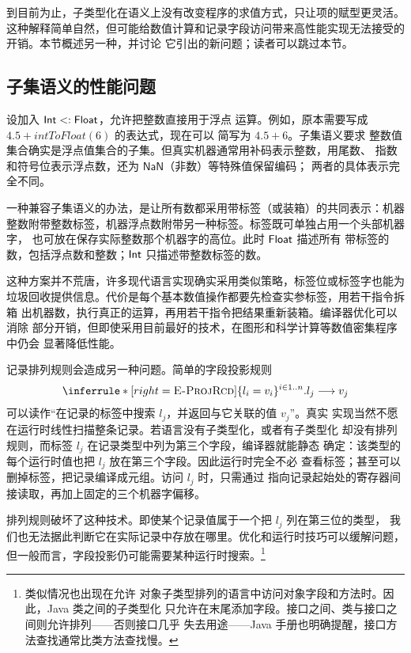 到目前为止，子类型化在语义上没有改变程序的求值方式，只让项的赋型更灵活。
这种解释简单自然，但可能给数值计算和记录字段访问带来高性能实现无法接受的
开销。本节概述另一种，并讨论
它引出的新问题；读者可以跳过本节。

\subsection*{子集语义的性能问题}

设加入 \(\mathsf{Int}\mathrel{<:}\mathsf{Float}\)，允许把整数直接用于浮点
运算。例如，原本需要写成 \(4.5+\mathit{intToFloat}(6)\) 的表达式，现在可以
简写为 \(4.5+6\)。子集语义要求
整数值集合确实是浮点值集合的子集。但真实机器通常用补码表示整数，用尾数、
指数和符号位表示浮点数，还为 \(\mathsf{NaN}\)（非数）等特殊值保留编码；
两者的具体表示完全不同。

一种兼容子集语义的办法，是让所有数都采用带标签（或装箱）的共同表示：机器
整数附带整数标签，机器浮点数附带另一种标签。标签既可单独占用一个头部机器字，
也可放在保存实际整数那个机器字的高位。此时 \(\mathsf{Float}\) 描述所有
带标签的数，包括浮点数和整数；\(\mathsf{Int}\) 只描述带整数标签的数。

这种方案并不荒唐，许多现代语言实现确实采用类似策略，标签位或标签字也能为
垃圾回收提供信息。代价是每个基本数值操作都要先检查实参标签，用若干指令拆箱
出机器数，执行真正的运算，再用若干指令把结果重新装箱。编译器优化可以消除
部分开销，但即使采用目前最好的技术，在图形和科学计算等数值密集程序中仍会
显著降低性能。

记录排列规则会造成另一种问题。简单的字段投影规则
\[
\inferrule*[right=\textsc{E-ProjRcd}]
 { }{\{l_i=v_i\}^{i\in1..n}.l_j\trans v_j}
\]
可以读作“在记录的标签中搜索 \(l_j\)，并返回与它关联的值 \(v_j\)”。真实
实现当然不愿在运行时线性扫描整条记录。若语言没有子类型化，或者有子类型化
却没有排列规则，而标签 \(l_j\) 在记录类型中列为第三个字段，编译器就能静态
确定：该类型的每个运行时值也把 \(l_j\) 放在第三个字段。因此运行时完全不必
查看标签；甚至可以删掉标签，把记录编译成元组。访问 \(l_j\) 时，只需通过
指向记录起始处的寄存器间接读取，再加上固定的三个机器字偏移。

排列规则破坏了这种技术。即使某个记录值属于一个把 \(l_j\) 列在第三位的类型，
我们也无法据此判断它在实际记录中存放在哪里。优化和运行时技巧可以缓解问题，
但一般而言，字段投影仍可能需要某种运行时搜索。\footnote{类似情况也出现在允许
对象子类型排列的语言中访问对象字段和方法时。因此，Java 类之间的子类型化
只允许在末尾添加字段。接口之间、类与接口之间则允许排列——否则接口几乎
失去用途——Java 手册也明确提醒，接口方法查找通常比类方法查找慢。}

